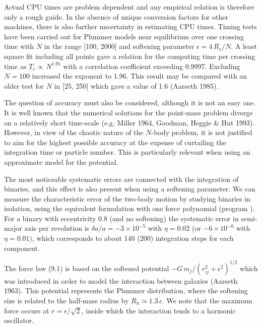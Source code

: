    Actual CPU times are problem dependent and any empirical
relation is therefore only a rough guide.
In the absence of unique conversion factors for other machines, there is also
further uncertainty in estimating CPU times.
Timing tests have been carried out for Plummer models near equilibrium
over one crossing time with $N$ in the range [100, 2000] and softening
parameter $\epsilon = 4 \, R_v/N$.
A least square fit including all points gave a relation for the computing
time per crossing time as $T_c \propto \, N^{1.91}$ with a
correlation coefficient exceeding 0.9997.
Excluding $N = 100$ increased the exponent to 1.96.
This result may be compared with an older test for $N$ in [25, 250]
which gave a value of 1.6 (Aarseth 1985).

   The question of accuracy must also be considered, although it is not an
easy one.
It is well known that the numerical solutions for the point-mass
problem diverge on a relatively short time-scale (e.g. Miller 1964,
Goodman, Heggie \& Hut 1993).
However, in view of the chaotic nature of the $N$-body problem, it is not
justified to aim for the highest possible accuracy at the expense of
curtailing the integration time or particle number.
This is particularly relevant when using an
approximate model for the potential.

   The most noticeable systematic errors are connected with the integration
of binaries, and this effect is also present when using a softening parameter.
We can measure the characteristic error of the two-body \hbox {motion} by studying
binaries in isolation, using the equivalent formulation with one force
polynomial (program ).
For a binary with eccentricity 0.8 (and no softening) the systematic error in
semi-major axis per revolution is $\delta a / a = - 3 \times 10^{-5}$ with
$\eta = 0.02$ (or $- 6 \times 10^{-6}$ with $\eta = 0.01)$,
which corresponds to about 140 (200)  integration steps for each component.

The force law (9.1) is based on the softened potential
$- G \, m_j /(r_{ij}^2 + \epsilon^2)^{1/2}$ which was introduced
in order to model the interaction between galaxies (Aarseth 1963).
This potential represents the Plummer distribution,
where the softening size is related to the half-mass radius by
$R_h \simeq 1.3 \, \epsilon$.
We note that the maximum force occurs at $r = \epsilon / \sqrt 2$,
inside which the interaction tends to a harmonic oscillator.

